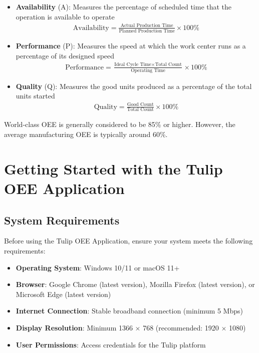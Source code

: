 \documentclass[12pt,a4paper]{report}
\newenvironment{tip}
  {\begin{tcolorbox}[colback=tuliplightgray,colframe=tulipgreen,title=Tip]}
  {\end{tcolorbox}}
\begin{document}
\begin{itemize}
    \item \textbf{Availability} (A): Measures the percentage of scheduled time that the operation is available to operate
    \begin{align}
    \text{Availability} = \frac{\text{Actual Production Time}}{\text{Planned Production Time}} \times 100\%
    \end{align}
    
    \item \textbf{Performance} (P): Measures the speed at which the work center runs as a percentage of its designed speed
    \begin{align}
    \text{Performance} = \frac{\text{Ideal Cycle Time} \times \text{Total Count}}{\text{Operating Time}} \times 100\%
    \end{align}
    
    \item \textbf{Quality} (Q): Measures the good units produced as a percentage of the total units started
    \begin{align}
    \text{Quality} = \frac{\text{Good Count}}{\text{Total Count}} \times 100\%
    \end{align}
\end{itemize}

\begin{tip}
World-class OEE is generally considered to be 85\% or higher. However, the average manufacturing OEE is typically around 60\%.
\end{tip}

\chapter{Getting Started with the Tulip OEE Application}

\section{System Requirements}

Before using the Tulip OEE Application, ensure your system meets the following requirements:

\begin{itemize}
    \item \textbf{Operating System}: Windows 10/11 or macOS 11+
    \item \textbf{Browser}: Google Chrome (latest version), Mozilla Firefox (latest version), or Microsoft Edge (latest version)
    \item \textbf{Internet Connection}: Stable broadband connection (minimum 5 Mbps)
    \item \textbf{Display Resolution}: Minimum 1366 × 768 (recommended: 1920 × 1080)
    \item \textbf{User Permissions}: Access credentials for the Tulip platform
\end{itemize}
\end{document}
